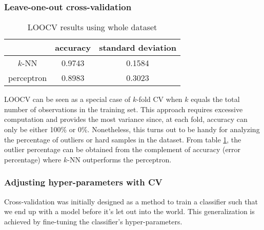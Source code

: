 \subsubsection{Leave-one-out cross-validation}
\begin{table}[]
	\renewcommand{\arraystretch}{1.3}
	\caption{LOOCV results using whole dataset}
	\label{tbl:LOOCV_res}
	\centering
	\begin{tabular}{|c||c|c|}
		\hline
		& accuracy & standard deviation \\ \hline \hline
		$k$-NN       &  0.9743  &   0.1584 \\ \hline
		perceptron   &  0.8983  &   0.3023 \\ \hline
	\end{tabular}
\end{table}
LOOCV can be seen as a special case of $k$-fold CV when $k$ equals the total number of observations in the training set. This approach requires excessive computation and provides the most variance since, at each fold, accuracy can only be either 100\% or 0\%. Nonetheless, this turns out to be handy for analyzing the percentage of outliers or hard samples in the dataset. From table \ref{tbl:LOOCV_res}, the outlier percentage can be obtained from the complement of accuracy (error percentage) where $k$-NN outperforms the perceptron. 

\subsubsection{Adjusting hyper-parameters with CV}
Cross-validation was initially designed as a method to train a classifier such that we end up with a  model before it's let out into the world. This generalization is achieved by fine-tuning the classifier's hyper-parameters.

